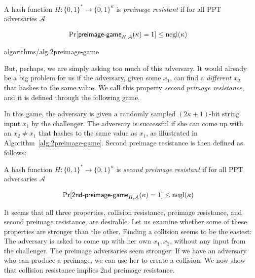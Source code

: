 \begin{definition}
  A hash function $H: \{0, 1\}^* \longrightarrow \{0, 1\}^\kappa$ is \emph{preimage resistant}
  if for all PPT adversaries $\mathcal{A}$

  \[
    \Pr[\textsf{preimage-game}_{H,\mathcal{A}}(\kappa) = 1] \leq \mathrm{negl}(\kappa)
  \]
\end{definition}

{algorithms/alg.2preimage-game}

But, perhaps, we are simply asking too much of this adversary. It would already be a big problem
for us if the adversary, given some $x_1$, can find a \emph{different} $x_2$ that hashes to the same
value. We call this property \emph{second primage resistance}, and it is defined through the following
game.

In this game, the adversary is given a randomly sampled $(2\kappa+1)$-bit string input $x_1$ by the challenger.
The adversary is successful if she can come up with an $x_2 \neq x_1$ that hashes to the same value as $x_1$,
as illustrated in Algorithm~\ref{alg.2preimage-game}.
Second preimage resistance is then defined as follows:

\begin{definition}
  A hash function $H: \{0, 1\}^* \longrightarrow \{0, 1\}^\kappa$ is \emph{second preimage resistant}
  if for all PPT adversaries $\mathcal{A}$

  \[
    \Pr[\textsf{2nd-preimage-game}_{H,\mathcal{A}}(\kappa) = 1] \leq \mathrm{negl}(\kappa)
  \]
\end{definition}

It seems that all three properties, collision resistance, preimage resistance, and second preimage
resistance, are desirable. Let us examine whether some of these properties are stronger than the other.
Finding a collision seems to be the easiest: The adversary is asked to come up with her own $x_1, x_2$,
without any input from the challenger. The preimage adversaries seem stronger: If we have
an adversary who can produce a preimage, we can use her to create a collision.
We now show that collision resistance implies 2nd preimage resistance.

